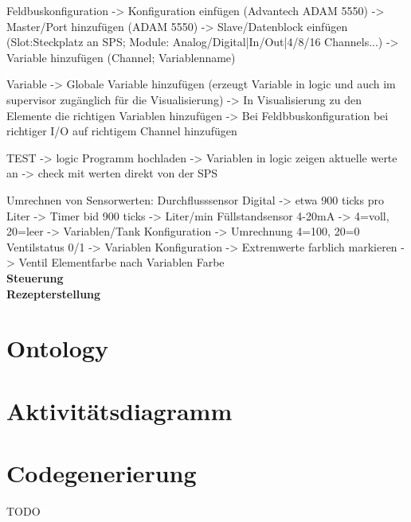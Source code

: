 Feldbuskonfiguration -> Konfiguration einfügen (Advantech ADAM 5550) -> Master/Port hinzufügen (ADAM 5550) -> Slave/Datenblock einfügen (Slot:Steckplatz an SPS; Module: Analog/Digital|In/Out|4/8/16 Channels...) -> Variable hinzufügen (Channel; Variablenname)

Variable -> Globale Variable hinzufügen (erzeugt Variable in logic und auch im supervisor zugänglich für die Visualisierung) -> In Visualisierung zu den Elemente die richtigen Variablen hinzufügen -> Bei Feldbbuskonfiguration bei richtiger I/O auf richtigem Channel hinzufügen

TEST -> logic Programm hochladen -> Variablen in logic zeigen aktuelle werte an -> check mit werten direkt von der SPS


Umrechnen von Sensorwerten: 
Durchflusssensor Digital -> etwa 900 ticks pro Liter -> Timer bid 900 ticks -> Liter/min
Füllstandsensor 4-20mA -> 4=voll, 20=leer -> Variablen/Tank Konfiguration -> Umrechnung 4=100, 20=0
Ventilstatus 0/1 -> Variablen Konfiguration -> Extremwerte farblich markieren -> Ventil Elementfarbe nach Variablen Farbe
\\
\textbf{Steuerung}\\

\textbf{Rezepterstellung}\\


\section{Ontology}
\section{Aktivitätsdiagramm}
\section{Codegenerierung}

TODO